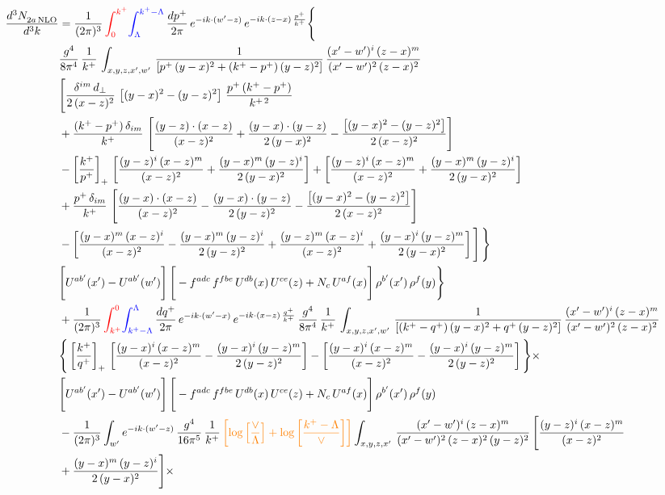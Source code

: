 \documentclass[9pt]{article}
\numberwithin{equation}{section}
\begin{document}
\begin{align}
    \frac{d^{3}N_{2a\,\rm NLO}^{\rm}}{d^{3}k}  & =  \frac{1}{(2\pi)^{3}}\,{\color{red}\int_{0}^{k^{+}}}{\color{blue}\int_{\Lambda}^{k^{+}-\Lambda}}\, \frac{dp^{+}}{2\pi} \, e^{-ik\cdot(w'-z)}\,e^{-ik\cdot (z-x)\,\frac{p^{+}}{k^{+}}} \Bigg\{\notag \\ & \frac{g^{4}}{8\pi^{4}}\,\frac{1}{k^{+}}\,\int_{x,y,z,x',w'}\,\frac{1}{\left[p^{+}\,(y-x)^{2}+(k^{+}-p^{+})\,(y-z)^{2}\right]}\, \frac{(x'-w')^{i}\,(z-x)^{m}}{(x'-w')^{2}\,(z-x)^{2}} \notag \\ & \Bigg[\frac{\delta^{im}\,d_{\perp}}{2\,(x-z)^{2}}\,\left[(y-x)^{2}-(y-z)^{2}\right]\,\frac{p^{+}\,(k^{+}-p^{+})}{k^{+\,2}}\notag \\ & +\frac{(k^{+}-p^{+})\,\delta_{im}}{k^{+}}\,\left[\frac{(y-z)\cdot (x-z)}{(x-z)^{2}}+\frac{(y-x)\cdot (y-z)}{2\,(y-x)^{2}}-\frac{\left[(y-x)^{2}-(y-z)^{2}\right]}{2\,(x-z)^{2}}\right]\notag \\ & -\left[\frac{k^{+}}{p^{+}}\right]_{+}\,\left[\frac{(y-z)^{i}\,(x-z)^{m}}{(x-z)^{2}}+\frac{(y-x)^{m}\,(y-z)^{i}}{2\,(y-x)^{2}}\right]+ \left[\frac{(y-z)^{i}\,(x-z)^{m}}{(x-z)^{2}}+\frac{(y-x)^{m}\,(y-z)^{i}}{2\,(y-x)^{2}}\right]\notag \\ & +\frac{p^{+}\,\delta_{im}}{k^{+}}\,\left[\frac{(y-x)\cdot (x-z)}{(x-z)^{2}}-\frac{(y-x)\cdot (y-z)}{2\,(y-z)^{2}}-\frac{\left[(y-x)^{2}-(y-z)^{2}\right]}{2\,(x-z)^{2}}\right]\notag \\ &-\left[\frac{(y-x)^{m}\,(x-z)^{i}}{(x-z)^{2}}-\frac{(y-x)^{m}\,(y-z)^{i}}{2\,(y-z)^{2}}+\frac{(y-z)^{m}\,(x-z)^{i}}{(x-z)^{2}}+\frac{(y-x)^{i}\,(y-z)^{m}}{2\,(y-x)^{2}}\right]\Bigg]\,\Bigg\} \notag \\ & \Bigg[U^{ab'}(x')-U^{ab'}(w')\Bigg]\,\Bigg[-f^{adc}\,f^{fbe}\,U^{db}(x)\,U^{ce}(z)+N_{c}\,U^{af}(x)\Bigg]\,\rho^{b'}(x')\,\rho^{f}(y)\Bigg\}\notag \\ & + \frac{1}{(2\pi)^{3}}\,{\color{red}\int^{0}_{k^{+}}}{\color{blue}\int^{\Lambda}_{k^{+}-\Lambda}}\, \frac{dq^{+}}{2\pi} \, e^{-ik\cdot(w'-x)}\,e^{-ik\cdot (x-z)\,\frac{q^{+}}{k^{+}}}\, \frac{g^{4}}{8\pi^{4}}\,\frac{1}{k^{+}}\, \int_{x,y,z,x',w'}\,\frac{1}{\left[(k^{+}-q^{+})\,(y-x)^{2}+q^{+}\,(y-z)^{2}\right]}\, \frac{(x'-w')^{i}\,(z-x)^{m}}{(x'-w')^{2}\,(z-x)^{2}} \notag \\ &\Bigg\{\left[\frac{k^{+}}{q^{+}}\right]_{+}\,\left[\frac{(y-x)^{i}\,(x-z)^{m}}{(x-z)^{2}}-\frac{(y-x)^{i}\,(y-z)^{m}}{2\,(y-z)^{2}}\right] -\left[\frac{(y-x)^{i}\,(x-z)^{m}}{(x-z)^{2}}-\frac{(y-x)^{i}\,(y-z)^{m}}{2\,(y-z)^{2}}\right]\Bigg\}\times\,\notag \\ & \Bigg[U^{ab'}(x')-U^{ab'}(w')\Bigg]\,\Bigg[-f^{adc}\,f^{fbe}\,U^{db}(x)\,U^{ce}(z)+N_{c}\,U^{af}(x)\Bigg]\,\rho^{b'}(x')\,\rho^{f}(y)\notag \\ & - \frac{1}{(2\pi)^{3}}  \int_{w^\prime} e^{-ik\cdot(w'-z)}\, \frac{g^{4}}{16\pi^{5}}\,\frac{1}{k^{+}}\,{\color{orange}\left[\log{\left[\frac{\vee}{\Lambda}\right]}+\log{\left[\frac{k^{+}-\Lambda}{\vee}\right]}\right]} \int_{x,y,z,x'}\, \frac{(x'-w')^{i}\,(z-x)^{m}}{(x'-w')^{2}\,(z-x)^{2}\, (y-z)^{2}}\,\Bigg[\frac{(y-z)^{i}\,(x-z)^{m}}{(x-z)^{2}}\notag \\ & +\frac{(y-x)^{m}\,(y-z)^{i}}{2\,(y-x)^{2}}\Bigg]\times\, 
\end{align}
\end{document}

